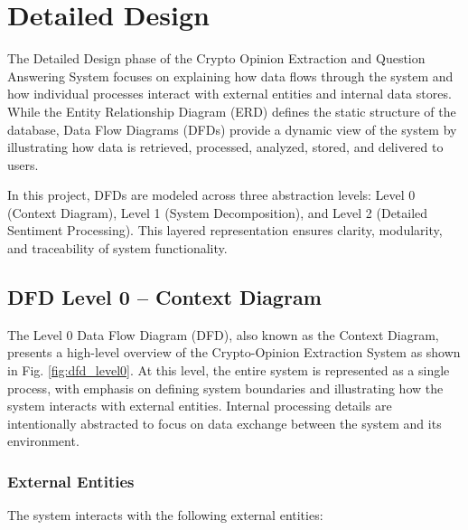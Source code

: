 
\chapter{Detailed Design}

The Detailed Design phase of the Crypto Opinion Extraction and Question Answering System focuses on explaining how data flows through the system and how individual processes interact with external entities and internal data stores. While the Entity Relationship Diagram (ERD) defines the static structure of the database, Data Flow Diagrams (DFDs) provide a dynamic view of the system by illustrating how data is retrieved, processed, analyzed, stored, and delivered to users.

In this project, DFDs are modeled across three abstraction levels: Level 0 (Context Diagram), Level 1 (System Decomposition), and Level 2 (Detailed Sentiment Processing). This layered representation ensures clarity, modularity, and traceability of system functionality.

\section{DFD Level 0 -- Context Diagram}

The Level 0 Data Flow Diagram (DFD), also known as the Context Diagram, presents a high-level overview of the Crypto-Opinion Extraction System as shown in Fig. \ref{fig:dfd_level0}. At this level, the entire system is represented as a single process, with emphasis on defining system boundaries and illustrating how the system interacts with external entities. Internal processing details are intentionally abstracted to focus on data exchange between the system and its environment.

\subsection{External Entities}

The system interacts with the following external entities:

